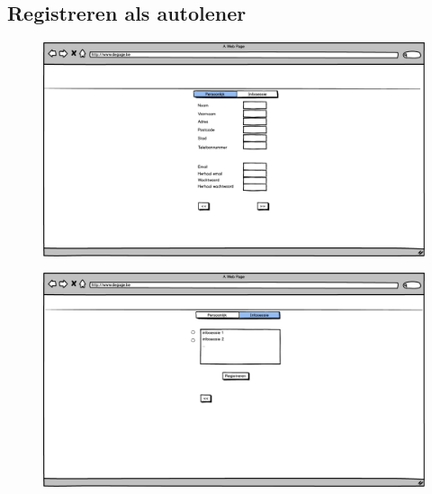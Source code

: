 \documentclass[11pt,a4paper,oneside]{article}
\begin{document}
\subsection{Registreren als autolener}
\begin{figure}[H]\includegraphics[width=\textwidth]{../../mockups/registratie_autolener_persoonlijk.png}\end{figure}
\begin{figure}[H]\includegraphics[width=\textwidth]{../../mockups/registratie_autolener_infosessie.png}\end{figure}
\end{document}
